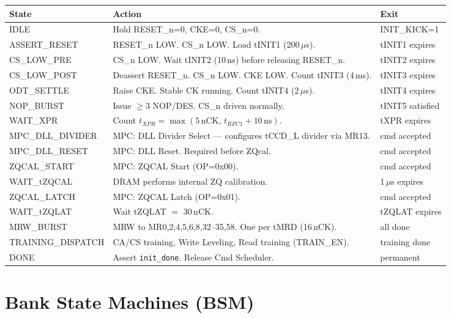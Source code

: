 \documentclass[10pt,a4paper]{article}
\newcommand{\Th}[1]{\cellcolor{thbg}\textbf{\small\color{acc1}#1}}
\newcommand{\RA}{\rowcolor{white}}
\newcommand{\RB}{\rowcolor{altbg}}
\begin{document}
\begin{center}
\begin{tabularx}{\linewidth}{@{} l X l @{}}
\toprule
\Th{State} & \Th{Action} & \Th{Exit} \\
\midrule
\RA IDLE                & Hold RESET\_n=0, CKE=0, CS\_n=0. & INIT\_KICK=1 \\
\RB ASSERT\_RESET       & RESET\_n LOW. CS\_n LOW. Load tINIT1 (200\,$\mu$s). & tINIT1 expires \\
\RA CS\_LOW\_PRE        & CS\_n LOW. Wait tINIT2 (10\,ns) before releasing RESET\_n. & tINIT2 expires \\
\RB CS\_LOW\_POST       & Deassert RESET\_n. CS\_n LOW. CKE LOW. Count tINIT3 (4\,ms). & tINIT3 expires \\
\RA ODT\_SETTLE         & Raise CKE. Stable CK running. Count tINIT4 (2\,$\mu$s). & tINIT4 expires \\
\RB NOP\_BURST          & Issue $\geq$3 NOP/DES. CS\_n driven normally. & tINIT5 satisfied \\
\RA WAIT\_XPR           & Count $t_{XPR}=\max(5\,\text{nCK},\,t_{RFC1}+10\,\text{ns})$. & tXPR expires \\
\RB MPC\_DLL\_DIVIDER   & MPC: DLL Divider Select — configures tCCD\_L divider via MR13. & cmd accepted \\
\RA MPC\_DLL\_RESET     & MPC: DLL Reset. Required before ZQcal. & cmd accepted \\
\RB ZQCAL\_START        & MPC: ZQCAL Start (OP=0x00). & cmd accepted \\
\RA WAIT\_tZQCAL        & DRAM performs internal ZQ calibration. & 1\,$\mu$s expires \\
\RB ZQCAL\_LATCH        & MPC: ZQCAL Latch (OP=0x01). & cmd accepted \\
\RA WAIT\_tZQLAT        & Wait tZQLAT $=$ 30\,nCK. & tZQLAT expires \\
\RB MRW\_BURST          & MRW to MR0,2,4,5,6,8,32--35,58. One per tMRD (16\,nCK). & all done \\
\RA TRAINING\_DISPATCH  & CA/CS training, Write Leveling, Read training (TRAIN\_EN). & training done \\
\RB DONE                & Assert \texttt{init\_done}. Release Cmd Scheduler. & permanent \\
\bottomrule
\end{tabularx}
\end{center}

\section{Bank State Machines (BSM)}
\end{document}
